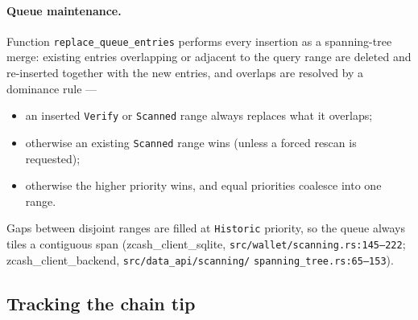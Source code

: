 \documentclass[11pt,a4paper]{article}
\theoremstyle{definition}
\begin{document}
\paragraph{Queue maintenance.} Function \texttt{replace\_queue\_entries}
performs every insertion as a spanning-tree merge: existing entries
overlapping or adjacent to the query range are deleted and re-inserted
together with the new entries, and overlaps are resolved by a dominance
rule ---
\begin{itemize}
\item an inserted \texttt{Verify} or \texttt{Scanned} range always replaces
  what it overlaps;
\item otherwise an existing \texttt{Scanned} range wins (unless a forced
  rescan is requested);
\item otherwise the higher priority wins, and equal priorities coalesce
  into one range.
\end{itemize}
Gaps between disjoint ranges are filled at \texttt{Historic} priority, so
the queue always tiles a contiguous span
(\textsf{zcash\_client\_sqlite}, \texttt{src/wallet/scanning.rs:145--222};
\textsf{zcash\_client\_backend}, \texttt{src/data\_api/scanning/}%
\allowbreak\texttt{spanning\_tree.rs:65--153}).

\subsection{Tracking the chain tip}\label{sec:sync-tip}
\end{document}
